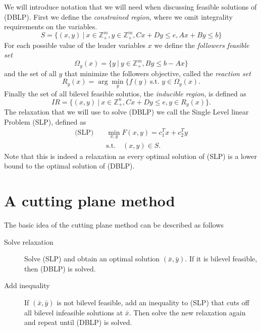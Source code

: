 \documentclass{article}
\begin{document}
We will introduce notation that we will need when discussing feasible solutions of (DBLP). 
First we define the \textit{constrained region}, where we omit integrality requirements on the variables.
\begin{equation*}
	S = \{(x,y) \ | \ x \in \mathbb{Z}^m_+, y \in \mathbb{Z}^m_+, Cx+Dy \le e, Ax + By \le b \}
\end{equation*}
For each possible value of the leader variables $x$ we define the \textit{followers feasible set}
\begin{equation*}
	\Omega_y(x) = \{y \ | \ y \in \mathbb{Z}^m_+, By \le b - Ax \}
\end{equation*}
and the set of all $y$ that minimize the followers objective, called the \textit{reaction set}
\begin{equation*}
	R_y(x) = \arg \min_y \{f(y) \ \text{s.t. } y \in \Omega_y(x).
\end{equation*}
Finally the set of all bilevel feasible solutios, the \textit{inducible region}, is defined as
\begin{equation*}
	IR = \{(x,y) \ | \ x \in \mathbb{Z}^n_+, Cx+Dy \le e, y \in R_y(x)\}.
\end{equation*}
The relaxation that we will use to solve (DBLP) we call the Single Level linear Problem (SLP), defined as
\begin{align*}
\text{(SLP)} \quad &\min_{x,y} F(x,y) = c_1^Tx +c_2^Ty \\
&\text{s.t.} \quad (x,y) \in S.
\end{align*} 
Note that this is indeed a relaxation as every optimal solution of (SLP) is a lower bound to the optimal solution of (DBLP).

\section{A cutting plane method}

The basic idea of the cutting plane method can be described as follows
\begin{description}
	\item[Solve relaxation] Solve (SLP) and obtain an optimal solution $(\bar x, \bar y)$.
	If it is bilevel feasible, then (DBLP) is solved.
	\item[Add inequality] If $(\bar x, \bar y)$ is not bilevel feasible, add an inequality to (SLP) that cuts off all bilevel infeasible solutions at $\bar x$. Then solve the new relaxation again and repeat until (DBLP) is solved.
\end{description}
\end{document}
